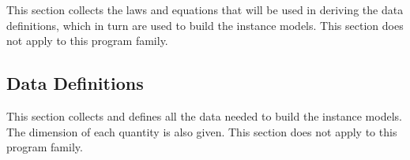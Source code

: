 \documentclass[12pt]{article}
\newcommand{\colAwidth}{0.13\textwidth}
\newcommand{\colBwidth}{0.82\textwidth}
\newcounter{theorynum} %
\newcommand{\tref}[1]{T\ref{#1}}
\begin{document}
This section collects the laws and equations that will be used in deriving the
data definitions, which in turn are used to build the instance models.
This section does not apply to this program family.

\subsection{Data Definitions}\label{sec_datadef}

This section collects and defines all the data needed to build the instance
models. The dimension of each quantity is also given.
This section does not apply to this program family.
~\newline


\end{document}
